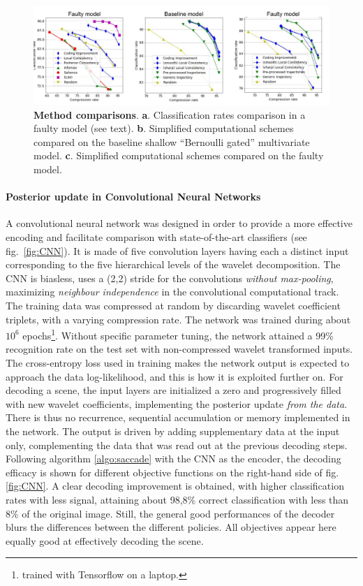 \documentclass{article}
\begin{document}
\begin{figure}[t]
	\vspace{-1cm}
	\centerline{
		\includegraphics[width = .8\linewidth]{img/NIPS-faulty.pdf} 
	}
	\vspace{-.2cm}
	\caption{\textbf{Method comparisons}. \textbf{a}. Classification rates comparison in a faulty model (see text). \textbf{b}. Simplified computational schemes compared on the baseline shallow ``Bernoulli gated'' multivariate model. \textbf{c}. Simplified computational schemes compared on the faulty model.}\label{fig:failed}
	\vspace{-.1cm}
\end{figure}

\paragraph{Posterior update in Convolutional Neural Networks}
A convolutional neural network was designed in order to provide a more effective encoding and facilitate comparison with state-of-the-art classifiers (see fig.~\ref{fig:CNN}). 
It is made of five convolution layers having each a distinct input corresponding to the five hierarchical levels of the wavelet decomposition. 
The CNN is biasless, uses a (2,2) stride for the convolutions \emph{without max-pooling}, maximizing \emph{neighbour independence} in the convolutional computational track.
The training data was compressed at random by discarding wavelet coefficient triplets, with a varying compression rate. The network was trained during about $10^6$ epochs\footnote{trained with Tensorflow on a laptop.}. Without specific parameter tuning, the network attained a 99\% recognition rate on the test set with non-compressed wavelet transformed inputs. 
The cross-entropy loss used in training makes the network output is expected to approach the data log-likelihood, and this is how it is exploited further on. For decoding a scene, the input layers are initialized a zero  and progressively filled with new wavelet coefficients, implementing the posterior update \emph{from the data}. There is thus no recurrence, sequential accumulation or memory implemented in the network. The output is driven by adding supplementary data at the input only, complementing the data that was read out at the previous decoding steps. 
Following algorithm \ref{algo:saccade} with the CNN as the encoder, the decoding efficacy is shown for different objective functions on the right-hand side of fig.\ref{fig:CNN}. A clear decoding improvement is obtained, with higher classification rates with less signal, attaining about 98,8\% correct classification with less than 8\% of the original image. Still, the general good performances of the decoder blurs the differences between the different policies. All objectives appear here equally good at effectively decoding the scene. 
\end{document}
